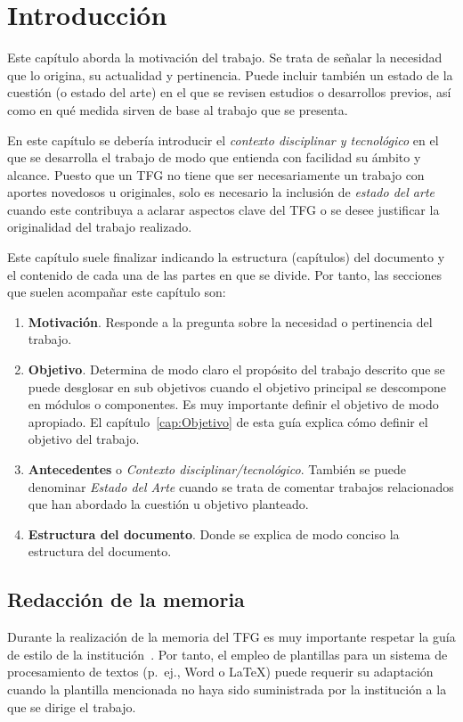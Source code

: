 \chapter{Introducción}
\label{cap:Introduccion}

Este capítulo aborda la motivación del trabajo. Se trata de señalar la necesidad que lo origina, su actualidad y pertinencia. Puede incluir también un estado de la cuestión (o estado del arte) en el que se revisen estudios o desarrollos previos, así como en qué medida sirven de base al trabajo que se presenta.

En este capítulo se debería introducir el \emph{contexto disciplinar y tecnológico} en el que se desarrolla el trabajo de modo que entienda con facilidad su ámbito y alcance. Puesto que un TFG no tiene que ser necesariamente un trabajo con aportes novedosos u originales, solo es necesario la inclusión de \emph{estado del arte} cuando este contribuya a aclarar aspectos clave del TFG o se desee justificar la originalidad del trabajo realizado.

Este capítulo suele finalizar indicando la estructura (capítulos) del documento y el contenido de cada una de las partes en que se divide. Por tanto, las secciones que suelen acompañar este capítulo son:
\begin{enumerate}
    \item \textbf{Motivación}. Responde a la pregunta sobre la necesidad o pertinencia del trabajo.
    \item \textbf{Objetivo}. Determina de modo claro el propósito del trabajo descrito que se puede desglosar en sub objetivos cuando el objetivo principal se descompone en módulos o componentes. Es muy importante definir el objetivo de modo apropiado. El capítulo~\ref{cap:Objetivo} de esta guía explica cómo definir el objetivo del trabajo.
    \item \textbf{Antecedentes} o \emph{Contexto disciplinar/tecnológico}. También se puede denominar \emph{Estado del Arte} cuando se trata de comentar trabajos relacionados que han abordado la cuestión u objetivo planteado.
    \item \textbf{Estructura del documento}. Donde se explica de modo conciso la estructura del documento.
\end{enumerate}


\section{Redacción de la memoria}
Durante la realización de la memoria del TFG es muy importante respetar la guía de estilo de la institución~\cite{esi19}. Por tanto, el empleo de plantillas para un sistema de procesamiento de textos (p.~ej., Word o \LaTeX) puede requerir su adaptación cuando la plantilla mencionada no haya sido suministrada por la institución a la que se dirige el trabajo.

